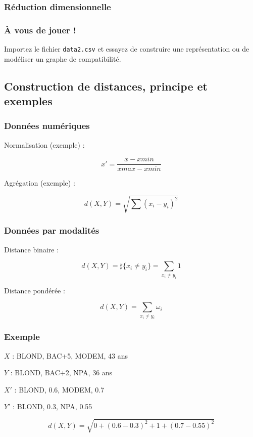 \documentclass[11pt]{beamer}
\newenvironment{slide}[1]{%
\begin{frame}[environment=slide]
\frametitle{#1}
}{%
\end{frame}
}
\newcommand{\Python}[1]{
	{\small	}
}
\begin{document}
\begin{slide}{Réduction dimensionnelle}
\begin{center}
\Python{acp}
\end{center}
\end{slide}


\begin{slide}{{\`A} vous de jouer !}

Importez le fichier \texttt{data2.csv} et essayez de construire une représentation ou de modéliser un graphe de compatibilité.

\end{slide}

\subsection{Construction de distances, principe et exemples}

\begin{slide}{Données numériques}

Normalisation (exemple) : 

$$x' = \frac{x-xmin}{xmax-xmin}$$

Agrégation (exemple) :

$$ d(X,Y) = \sqrt{\sum(x_i-y_i)^2} $$

\end{slide}

\begin{slide}{Données par modalités}

Distance binaire :

$$ d(X,Y) = \sharp \{ x_i \neq y_i \} = \sum_{x_i \neq y_i} 1 $$

Distance pondérée :

$$ d(X,Y) = \sum_{x_i \neq y_i} \omega_i $$

\end{slide}

\begin{slide}{Exemple}

$X$ : BLOND, BAC+5, MODEM, 43 ans

$Y$ : BLOND, BAC+2, NPA, 36 ans\\

\vspace{0.2cm}

\pause

$X'$ : BLOND, 0.6, MODEM, 0.7

$Y'$ : BLOND, 0.3, NPA, 0.55

\pause

$$d(X,Y) = \sqrt{0 + (0.6-0.3)^2 + 1 + (0.7-0.55)^2}$$

\end{slide}
\end{document}
